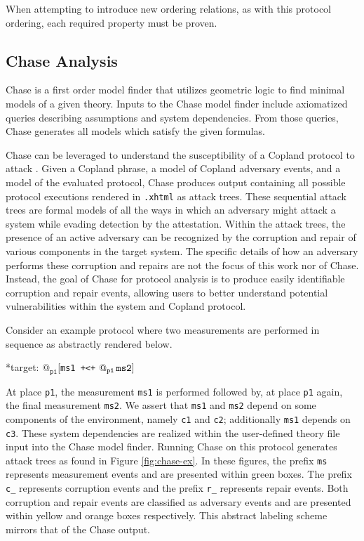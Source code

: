 \documentclass[runningheads]{llncs}
\theoremstyle{definition}
\begin{document}
\noindent When attempting to introduce new ordering relations, as with this protocol ordering, each required property must be proven.  

\subsection*{Chase Analysis}

Chase \cite{Ramsdell:2020:Chase,Rowe:2021:AutomatedTrust} is a first order model finder that utilizes geometric logic\cite{Enderton:logic} to find minimal models of a given theory. Inputs to the Chase model finder include axiomatized queries describing assumptions and system dependencies. From those queries, Chase generates all models which satisfy the given formulas. 

Chase can be leveraged to understand the susceptibility of a Copland protocol to attack \cite{Rowe:2021:AutomatedTrust}. Given a Copland phrase, a model of Copland adversary events, and a model of the evaluated protocol, Chase produces output containing all possible protocol executions rendered in \texttt{.xhtml} as attack trees. These sequential attack trees \cite{Horne:Attack, Jhaware:attack} are formal models of all the ways in which an adversary might attack a system while evading detection by the attestation. Within the attack trees, the presence of an active adversary can be recognized by the corruption and repair of various components in the target system. The specific details of how an adversary performs these corruption and repairs are not the focus of this work nor of Chase. Instead, the goal of Chase for protocol analysis is to produce easily identifiable corruption and repair events, allowing users to better understand potential vulnerabilities within the system and Copland protocol. 

Consider an example protocol where two measurements are performed in sequence as abstractly rendered below.

\begin{center}
    *target: $@_{\texttt{p1}}$[\texttt{ms1 +<+} $\mathop{@_{\texttt{p1}}}{\texttt{ms2}}]$
\end{center}

\noindent At place \texttt{p1}, the measurement \texttt{ms1} is performed followed by, at place \texttt{p1} again, the final measurement \texttt{ms2}. We assert that \texttt{ms1} and \texttt{ms2} depend on some components of the environment, namely \texttt{c1} and \texttt{c2}; additionally \texttt{ms1} depends on \texttt{c3}. These system dependencies are realized within the user-defined theory file input into the Chase model finder. Running Chase on this protocol generates attack trees as found in Figure \ref{fig:chase-ex}. In these figures, the prefix \texttt{ms} represents measurement events and are presented within green boxes. The prefix \texttt{c\_} represents corruption events and the prefix \texttt{r\_} represents repair events. Both corruption and repair events are classified as adversary events and are presented within yellow and orange boxes respectively. This abstract labeling scheme mirrors that of the Chase output.
\end{document}
